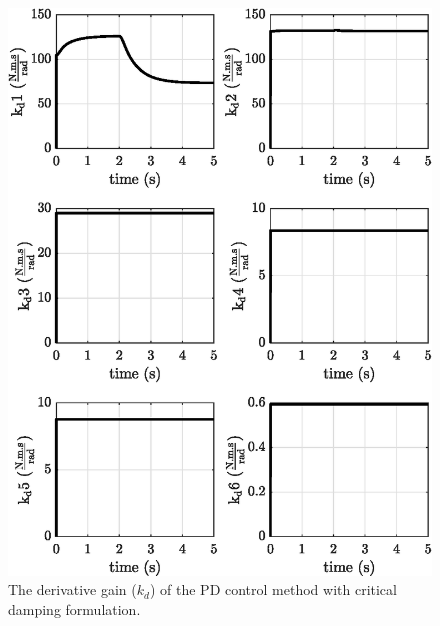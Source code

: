 \begin{figure}
    \centering
    \includegraphics{images/act_1.5/kd.eps}
    \caption{The derivative gain ($k_d$) of the PD control method with critical damping formulation.}
    \label{fig:act_1.5_k_d}
\end{figure}


